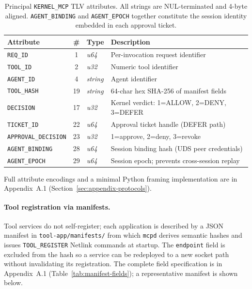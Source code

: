 \begin{table}[H]
\centering\small
\begin{tabular}{@{}lcl p{5.8cm}@{}}
\toprule
\textbf{Attribute} & \textbf{\#} & \textbf{Type} & \textbf{Description} \\
\midrule
\texttt{REQ\_ID}            & 1  & \textit{u64}    & Per-invocation request identifier \\
\texttt{TOOL\_ID}           & 2  & \textit{u32}    & Numeric tool identifier \\
\texttt{AGENT\_ID}          & 4  & \textit{string} & Agent identifier \\
\texttt{TOOL\_HASH}         & 19 & \textit{string} & 64-char hex SHA-256 of manifest fields \\
\texttt{DECISION}           & 17 & \textit{u32}    & Kernel verdict: 1=ALLOW, 2=DENY, 3=DEFER \\
\texttt{TICKET\_ID}         & 22 & \textit{u64}    & Approval ticket handle (DEFER path) \\
\texttt{APPROVAL\_DECISION} & 23 & \textit{u32}    & 1=approve, 2=deny, 3=revoke \\
\texttt{AGENT\_BINDING}     & 28 & \textit{u64}    & Session binding hash (UDS peer credentials) \\
\texttt{AGENT\_EPOCH}       & 29 & \textit{u64}    & Session epoch; prevents cross-session replay \\
\bottomrule
\end{tabular}
\caption{Principal \texttt{KERNEL\_MCP} TLV attributes. All strings are NUL-terminated and 4-byte aligned. \texttt{AGENT\_BINDING} and \texttt{AGENT\_EPOCH} together constitute the session identity embedded in each approval ticket.}
\label{tab:netlink-attrs}
\end{table}

Full attribute encodings and a minimal Python framing implementation are in Appendix~A.1 (Section~\ref{sec:appendix-protocols}).

\paragraph{Tool registration via manifests.}
Tool services do not self-register; each application is described by a JSON manifest in \texttt{tool-app/manifests/} from which \texttt{mcpd} derives semantic hashes and issues \texttt{TOOL\_REGISTER} Netlink commands at startup.
The \texttt{endpoint} field is excluded from the hash so a service can be redeployed to a new socket path without invalidating its registration.
The complete field specification is in Appendix~A.1 (Table~\ref{tab:manifest-fields}); a representative manifest is shown below.

